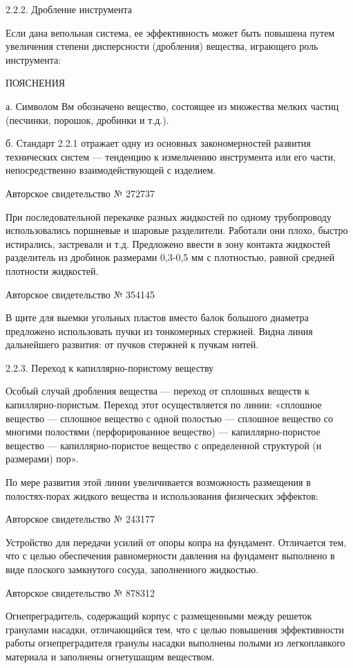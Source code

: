 2.2.2. Дробление инструмента

Если  дана вепольная  система,  ее эффективность  может быть  повышена
путем увеличения степени  дисперсности (дробления) вещества, играющего
роль инструмента:


ПОЯСНЕНИЯ

а.  Символом Вм  обозначено  вещество, состоящее  из множества  мелких
частиц (песчинки, порошок, дробинки и т.д.).

б. Стандарт  2.2.1 отражает одну из  основных закономерностей развития
технических  систем  — тенденцию  к  измельчению  инструмента или  его
части, непосредственно взаимодействующей с изделием.


Авторское свидетельство № 272737

При последовательной перекачке разных жидкостей по одному трубопроводу
использовались поршневые  и шаровые  разделители. Работали  они плохо,
быстро истирались, застревали и т.д. Предложено ввести в зону контакта
жидкостей разделитель  из дробинок размерами 0,3-0,5  мм с плотностью,
равной средней плотности жидкостей.


Авторское свидетельство № 354145

В  щите для  выемки угольных  пластов вместо  балок большого  диаметра
предложено  использовать пучки  из тонкомерных  стержней. Видна  линия
дальнейшего развития: от пучков стержней к пучкам нитей.


2.2.3. Переход к капиллярно-пористому веществу

Особый  случай дробления  вещества  — переход  от  сплошных веществ  к
капиллярно-пористым. Переход  этот осуществляется по  линии: «сплошное
вещество — сплошное  вещество с одной полостью —  сплошное вещество со
многими  полостями  (перфорированное вещество)  —  капиллярно-пористое
вещество —  капиллярно-пористое вещество с определенной  структурой (и
размерами) пор».

По  мере развития  этой линии  увеличивается возможность  размещения в
полостях-порах жидкого вещества и использования физических эффектов:


Авторское свидетельство № 243177

Устройство для передачи усилий от опоры копра на фундамент. Отличается
тем,  что  с целью  обеспечения  равномерности  давления на  фундамент
выполнено в виде плоского замкнутого сосуда, заполненного жидкостью.


Авторское свидетельство № 878312

Огнепреградитель,  содержащий  корпус  с  размещенными  между  решеток
гранулами   насадки,  отличающийся   тем,   что   с  целью   повышения
эффективности работы огнепреградителя гранулы насадки выполнены полыми
из легкоплавкого материала и заполнены огнетушащим веществом.


